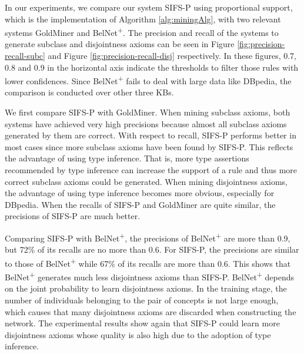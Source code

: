 In our experiments, we compare our system SIFS-P using proportional support, which is the implementation of Algorithm \ref{alg:miningAlg}, with two relevant systems GoldMiner and BelNet\textsuperscript{+}. The precision and recall of the systems to generate subclass and disjointness axioms can be seen in Figure  \ref{fig:precision-recall-subc} and Figure \ref{fig:precision-recall-disj} respectively. In these figures, 0.7, 0.8 and 0.9 in the horizontal axis indicate the thresholds to filter those rules with lower confidences. Since BelNet\textsuperscript{+} fails to deal with large data like DBpedia, the comparison is conducted over other three KBs.

We first compare SIFS-P with GoldMiner. When mining subclass axioms, both systems have achieved very high precisions because almost all subclass axioms generated by them are correct. With respect to recall, SIFS-P performs better in most cases since more subclass axioms have been found by SIFS-P. This reflects the advantage of using type inference. That is, more type assertions recommended by type inference can increase the support of a rule and thus more correct subclass axioms could be generated.
%
When mining disjointness axioms, the advantage of using type inference becomes more obvious, especially for DBpedia. When the recalls of SIFS-P and GoldMiner are quite similar, the precisions of SIFS-P are much better.



Comparing SIFS-P with BelNet\textsuperscript{+}, the precisions of BelNet\textsuperscript{+} are more than 0.9, but 72\% of its recalls are no more than 0.6. For SIFS-P, the precisions are similar to those of BelNet\textsuperscript{+} while 67\% of its recalls are more than 0.6. This shows that BelNet\textsuperscript{+} generates much less disjointness axioms than SIFS-P.
%
BelNet\textsuperscript{+} depends on the joint probability to learn disjointness axioms. In the training stage, the number of individuals belonging to the pair of concepts is not large enough, which causes that many disjointness axioms are discarded when constructing the network.
%
The experimental results show again that SIFS-P could learn more disjointness axioms whose quality is also high due to the adoption of type inference.

